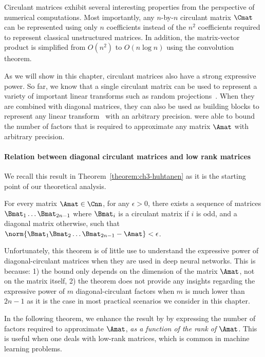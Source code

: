 Circulant matrices exhibit several interesting properties from the perspective of numerical computations.
Most importantly, any $n$-by-$n$ circulant matrix $\Cmat$ can be represented using only $n$ coefficients instead of the $n^2$ coefficients required to represent classical unstructured matrices.
In addition, the matrix-vector product is simplified from $O(n^2)$ to $O(n \log n)$ using the  convolution theorem.

As we will show in this chapter, circulant matrices also have a strong expressive power.
So far, we know that a single circulant matrix can be used to represent a variety of important linear transforms such as random projections~\cite{hinrichs2011johnson}. 
When they are combined with diagonal matrices, they can also be used as building blocks to represent any linear transform~\cite{schmid2000decomposing, Huhtanen2015} with an arbitrary precision.
\citet{Huhtanen2015} were able to bound the number of factors that is required to approximate any matrix $\Amat$ with arbitrary precision.

\paragraph{Relation between diagonal circulant matrices and low rank matrices}
We recall this result in Theorem~\ref{theorem:ch3-huhtanen} as it is the starting point of our theoretical analysis.

\begin{theorem} \label{theorem:ch3-huhtanen}
  For every matrix $\Amat \in \Cnn$, for any $\epsilon > 0$, there exists a sequence of matrices $\Bmat_1 \ldots \Bmat_{2n-1}$ where $\Bmat_{i}$ is a circulant matrix if $i$ is odd, and a diagonal matrix otherwise, such that $\norm{\Bmat_{1} \Bmat_{2} \ldots \Bmat_{2n-1} - \Amat} < \epsilon$.
\end{theorem}

Unfortunately, this theorem is of little use to understand the expressive power of diagonal-circulant matrices when they are used in deep neural networks.
This is because: 1) the bound only depends on the dimension of the matrix $\Amat$, not on the matrix itself, 2) the theorem does not provide any insights regarding the expressive power of $m$ diagonal-circulant factors when $m$ is much lower than $2n - 1$ as it is the case in most practical scenarios we consider in this chapter. 

In the following theorem, we enhance the result by \citet{Huhtanen2015} by expressing the number of factors required to approximate $\Amat$, \emph{as a function of the rank of $\Amat$}.
This is useful when one deals with low-rank matrices, which is common in machine learning problems. 

